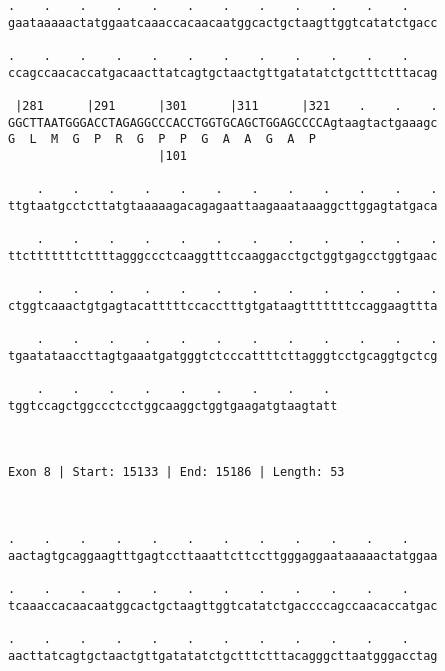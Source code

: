 \documentclass{article}
\begin{document}
\begin{Verbatim}
.    .    .    .    .    .    .    .    .    .    .    .    
gaataaaaactatggaatcaaaccacaacaatggcactgctaagttggtcatatctgacc
                                                            
.    .    .    .    .    .    .    .    .    .    .    .    
ccagccaacaccatgacaacttatcagtgctaactgttgatatatctgctttctttacag
                                                            
 |281      |291      |301      |311      |321    .    .    .
GGCTTAATGGGACCTAGAGGCCCACCTGGTGCAGCTGGAGCCCCAgtaagtactgaaagc
G  L  M  G  P  R  G  P  P  G  A  A  G  A  P                 
                     |101                                   
  
    .    .    .    .    .    .    .    .    .    .    .    .
ttgtaatgcctcttatgtaaaaagacagagaattaagaaataaaggcttggagtatgaca
                                                            
    .    .    .    .    .    .    .    .    .    .    .    .
ttctttttttcttttagggccctcaaggtttccaaggacctgctggtgagcctggtgaac
                                                            
    .    .    .    .    .    .    .    .    .    .    .    .
ctggtcaaactgtgagtacatttttccacctttgtgataagtttttttccaggaagttta
                                                            
    .    .    .    .    .    .    .    .    .    .    .    .
tgaatataaccttagtgaaatgatgggtctcccattttcttagggtcctgcaggtgctcg
                                                            
    .    .    .    .    .    .    .    .    . 
tggtccagctggccctcctggcaaggctggtgaagatgtaagtatt
                                              
                                              
 
Exon 8 | Start: 15133 | End: 15186 | Length: 53



.    .    .    .    .    .    .    .    .    .    .    .    
aactagtgcaggaagtttgagtccttaaattcttccttgggaggaataaaaactatggaa
                                                            
.    .    .    .    .    .    .    .    .    .    .    .    
tcaaaccacaacaatggcactgctaagttggtcatatctgaccccagccaacaccatgac
                                                            
.    .    .    .    .    .    .    .    .    .    .    .    
aacttatcagtgctaactgttgatatatctgctttctttacagggcttaatgggacctag
                                                            

\end{Verbatim}
\end{document}
